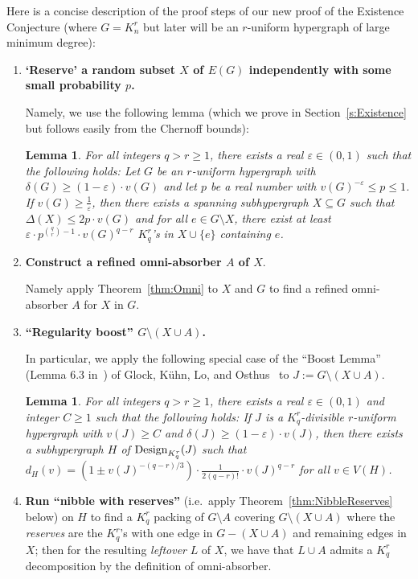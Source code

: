 \documentclass[11pt]{article}
\newcounter{i}
\theoremstyle{plain}
\newtheorem{lem}[thm]{Lemma}
\theoremstyle{plain} %
\theoremstyle{definition}
\begin{document}
\noindent
Here is a concise description of the proof steps of our new proof of the Existence Conjecture (where $G=K_n^r$ but later will be an $r$-uniform hypergraph of large minimum degree):
\begin{enumerate}
    \item[(1)] {\bf `Reserve' a random subset $X$ of $E(G)$ independently with some small probability $p$.}
    
    Namely, we use the following lemma (which we prove in Section~\ref{s:Existence} but follows easily from the Chernoff bounds):
    
    \begin{lem}\label{lem:RandomX}
    For all integers $q> r\ge 1$, there exists a real $\varepsilon \in (0,1)$ such that the following holds: Let $G$ be an $r$-uniform hypergraph with $\delta(G)\ge (1-\varepsilon)\cdot v(G)$ and let $p$ be a real number with $v(G)^{-\varepsilon} \le p \le 1$. If $v(G)\ge \frac{1}{\varepsilon}$, then there exists a spanning subhypergraph  $X\subseteq G$ such that $\Delta(X)\le 2p\cdot v(G)$ and for all $e\in G\setminus X$, there exist at least $\varepsilon\cdot p^{\binom{q}{r}-1}\cdot v(G)^{q-r}$ $K_q^r$'s in $X\cup \{e\}$ containing $e$.
    \end{lem}

    
    \item[(2)] {\bf Construct a refined omni-absorber $A$ of $X$}.
    
    Namely apply Theorem~\ref{thm:Omni} to $X$ and $G$ to find a refined omni-absorber $A$ for $X$ in $G$.
        
    \item[(3)] {\bf ``Regularity boost'' $G\setminus (X\cup A)$.}
    
    In particular, we apply the following special case of the ``Boost Lemma'' (Lemma 6.3 in~\cite{GKLO16}) of Glock, K\"{u}hn, Lo, and Osthus~\cite{GKLO16} to $J:= G\setminus (X\cup A)$.

\begin{lem}\label{lem:RegBoost}
For all integers $q> r \ge 1$, there exists a real $\varepsilon \in (0,1)$ and integer $C\ge 1$  such that the following holds: If $J$ is a $K_q^r$-divisible $r$-uniform hypergraph with $v(J)\ge C$ and $\delta(J) \ge (1-\varepsilon)\cdot v(J)$, then there exists a subhypergraph $H$ of ${\rm Design}_{K_q^r}(J)$ such that $d_H(v) = (1 \pm v(J)^{-(q-r)/3}) \cdot \frac{1}{2(q-r)!} \cdot v(J)^{q-r}$ for all $v\in V(H)$.
\end{lem}

    \item[(4)] {\bf Run ``nibble with reserves''} (i.e.~apply Theorem~\ref{thm:NibbleReserves} below) on $H$ to find a $K_q^r$ packing of $G\setminus A$ covering $G\setminus (X\cup A)$ where the \emph{reserves} are the $K_q^r$'s with one edge in $G-(X\cup A)$ and remaining edges in $X$; then for the resulting \emph{leftover} $L$ of $X$, we have that $L\cup A$ admits a $K_q^r$ decomposition by the definition of omni-absorber. 
\end{enumerate}
\end{document}
